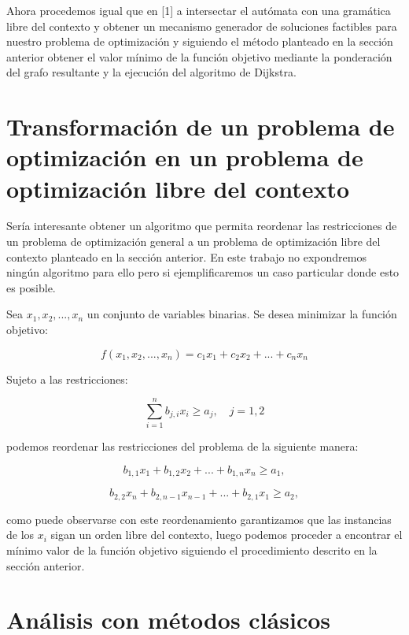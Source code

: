 \documentclass{article}
\begin{document}
Ahora procedemos igual que en [1] a intersectar el autómata con una gramática libre del contexto y obtener un mecanismo generador de soluciones factibles
para nuestro problema de optimización y siguiendo el método planteado en la sección anterior obtener el valor mínimo de la función objetivo mediante la ponderación
del grafo resultante y la ejecución del algoritmo de Dijkstra.

\section*{Transformación de un problema de optimización en un problema de optimización libre del contexto}

Sería interesante obtener un algoritmo que permita reordenar las restricciones de un problema de optimización general a un problema de optimización
libre del contexto planteado en la sección anterior. En este trabajo no expondremos ningún algoritmo para ello pero si ejemplificaremos un caso particular
donde esto es posible. 

Sea $x_1, x_2, ..., x_n$ un conjunto de variables binarias. Se desea minimizar la función objetivo:

\begin{equation}
    f(x_1, x_2, ..., x_n) = c_1x_1 + c_2x_2 + ... + c_nx_n
\end{equation}

Sujeto a las restricciones:

\begin{equation}
    \sum_{i = 1}^{n} b_{j,i}x_i \geq a_j, \quad j = 1, 2
\end{equation}

podemos reordenar las restricciones del problema de la siguiente manera:

\begin{equation}
    b_{1,1}x_1+b_{1,2}x_2+...+b_{1,n}x_n \geq a_1,
\end{equation}

\begin{equation}
    b_{2,2}x_n+b_{2,n-1}x_{n-1}+...+b_{2,1}x_1 \geq a_2,
\end{equation}

como puede observarse con este reordenamiento garantizamos que las instancias de los $x_i$ sigan un orden libre del contexto, luego podemos proceder 
a encontrar el mínimo valor de la función objetivo siguiendo el procedimiento descrito en la sección anterior.


\section*{Análisis con métodos clásicos}
\end{document}
